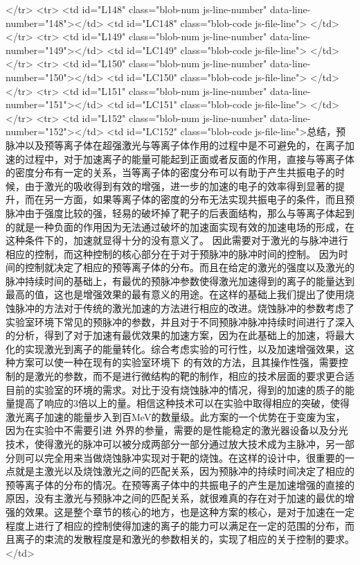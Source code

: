       </tr>
      <tr>
        <td id="L148" class="blob-num js-line-number" data-line-number="148"></td>
        <td id="LC148" class="blob-code js-file-line">
</td>
      </tr>
      <tr>
        <td id="L149" class="blob-num js-line-number" data-line-number="149"></td>
        <td id="LC149" class="blob-code js-file-line">
</td>
      </tr>
      <tr>
        <td id="L150" class="blob-num js-line-number" data-line-number="150"></td>
        <td id="LC150" class="blob-code js-file-line">
</td>
      </tr>
      <tr>
        <td id="L151" class="blob-num js-line-number" data-line-number="151"></td>
        <td id="LC151" class="blob-code js-file-line">
</td>
      </tr>
      <tr>
        <td id="L152" class="blob-num js-line-number" data-line-number="152"></td>
        <td id="LC152" class="blob-code js-file-line">总结，预脉冲以及预等离子体在超强激光与等离子体作用的过程中是不可避免的，在离子加速的过程中，对于加速离子的能量可能起到正面或者反面的作用，直接与等离子体的密度分布有一定的关系，当等离子体的密度分布可以有助于产生共振电子的时候，由于激光的吸收得到有效的增强，进一步的加速的电子的效率得到显著的提升，而在另一方面，如果等离子体的密度的分布无法实现共振电子的条件，而且预脉冲由于强度比较的强，轻易的破坏掉了靶子的后表面结构，那么与等离子体起到的就是一种负面的作用因为无法通过破坏的加速面实现有效的加速电场的形成，在这种条件下的，加速就显得十分的没有意义了。 因此需要对于激光的与脉冲进行相应的控制，而这种控制的核心部分在于对于预脉冲的脉冲时间的控制。 因为时间的控制就决定了相应的预等离子体的分布。而且在给定的激光的强度以及激光的脉冲持续时间的基础上，有最优的预脉冲参数使得激光加速得到的离子的能量达到最高的值，这也是增强效果的最有意义的用途。在这样的基础上我们提出了使用烧蚀脉冲的方法对于传统的激光加速的方法进行相应的改进。烧蚀脉冲的参数考虑了实验室环境下常见的预脉冲的参数，并且对于不同预脉冲脉冲持续时间进行了深入的分析，得到了对于加速有最优效果的加速方案，因为在此基础上的加速，将最大化的实现激光到离子的能量转化。综合考虑实验的可行性，以及加速增强效果，这种方案可以使一种在现有的实验室环境下 的有效的方法，且其操作性强，需要控制的是激光的参数，而不是进行微结构的靶的制作，相应的技术层面的要求更合适目前的实验室的环境的需求。对比于没有烧蚀脉冲的情况，得到的加速的质子的能量提高了响应的3倍以上的量。相信这种技术可以在实验中取得相应的突破，使得激光离子加速的能量步入到百MeV的数量级。此方案的一个优势在于变废为宝，因为在实验中不需要引进 外界的参量，需要的是性能稳定的激光器设备以及分光技术，使得激光的脉冲可以被分成两部分一部分通过放大技术成为主脉冲，另一部分则可以完全用来当做烧蚀脉冲实现对于靶的烧蚀。在这样的设计中，很重要的一点就是主激光以及烧蚀激光之间的匹配关系，因为预脉冲的持续时间决定了相应的预等离子体的分布的情况。在预等离子体中的共振电子的产生是加速增强的直接的原因，没有主激光与预脉冲之间的匹配关系，就很难真的存在对于加速的最优的增强的效果。这是整个章节的核心的地方，也是这种方案的核心，是对于加速在一定程度上进行了相应的控制使得加速的离子的能力可以满足在一定的范围的分布，而且离子的束流的发散程度是和激光的参数相关的，实现了相应的关于控制的要求。</td>
